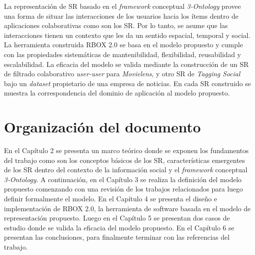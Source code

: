 La representación de SR basado en el \textit{framework} conceptual \textit{3-Ontology} provee una forma de situar las interacciones de los usuarios hacia los ítems dentro de aplicaciones colaborativas como son los SR. Por lo tanto, se asume que las interacciones tienen un contexto que les da un sentido espacial, temporal y social. La herramienta construida RBOX 2.0 se basa en el modelo propuesto y cumple con las propiedades sistemáticas de mantenibilidad, flexibilidad, reusabilidad y escalabilidad. La eficacia del modelo se valida mediante la construcción de un SR de filtrado colaborativo \textit{user-user} para \textit{Movielens}, y otro SR de \textit{Tagging Social} bajo un \textit{dataset} propietario de una empresa de noticias. En cada SR construido se muestra la correspondencia del dominio de aplicación al modelo propuesto.

\section{Organizaci\'on del documento}

En el Capítulo 2 se presenta un marco teórico donde se exponen los fundamentos del trabajo como son los conceptos básicos de los SR, características emergentes de los SR dentro del contexto de la información social y el \textit{framework} conceptual \textit{3-Ontology}. A continuación, en el Capítulo 3 se realiza la definición del modelo propuesto comenzando con una revisión de los trabajos relacionados para luego definir formalmente el modelo. En el Capítulo 4 se presenta el diseño e implementación de RBOX 2.0, la herramienta de software basada en el modelo de representación propuesto. Luego en el Capítulo 5 se presentan dos casos de estudio donde se valida la eficacia del modelo propuesto. En el Capítulo 6 se presentan las conclusiones, para finalmente terminar con las referencias del trabajo.